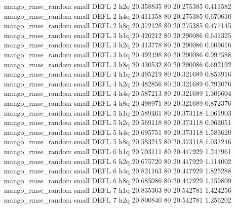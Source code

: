 mango_rmse_random      small     DEFL                 2                  h2q 20.358835 80      20.275385           0.411582
mango_rmse_random      small     DEFL                 2                  h4q 20.411358 80      20.275385           0.670630
mango_rmse_random      small     DEFL                 2                  h8q 20.372128 80      20.275385           0.477145
mango_rmse_random      small     DEFL                 3                  h1q 20.420212 80      20.290086           0.641325
mango_rmse_random      small     DEFL                 3                  h2q 20.413778 80      20.290086           0.609616
mango_rmse_random      small     DEFL                 3                  h4q 20.492498 80      20.290086           0.997588
mango_rmse_random      small     DEFL                 3                  h8q 20.430532 80      20.290086           0.692192
mango_rmse_random      small     DEFL                 4                  h1q 20.495219 80      20.321689           0.853916
mango_rmse_random      small     DEFL                 4                  h2q 20.482856 80      20.321689           0.793076
mango_rmse_random      small     DEFL                 4                  h4q 20.587213 80      20.321689           1.306604
mango_rmse_random      small     DEFL                 4                  h8q 20.498971 80      20.321689           0.872376
mango_rmse_random      small     DEFL                 5                  h1q 20.589461 80      20.373118           1.061903
mango_rmse_random      small     DEFL                 5                  h2q 20.569118 80      20.373118           0.962051
mango_rmse_random      small     DEFL                 5                  h4q 20.695751 80      20.373118           1.583620
mango_rmse_random      small     DEFL                 5                  h8q 20.583215 80      20.373118           1.031246
mango_rmse_random      small     DEFL                 6                  h1q 20.703111 80      20.447929           1.247961
mango_rmse_random      small     DEFL                 6                  h2q 20.675720 80      20.447929           1.114002
mango_rmse_random      small     DEFL                 6                  h4q 20.821163 80      20.447929           1.825288
mango_rmse_random      small     DEFL                 6                  h8q 20.685086 80      20.447929           1.159809
mango_rmse_random      small     DEFL                 7                  h1q 20.835363 80      20.542781           1.424256
mango_rmse_random      small     DEFL                 7                  h2q 20.800840 80      20.542781           1.256202
